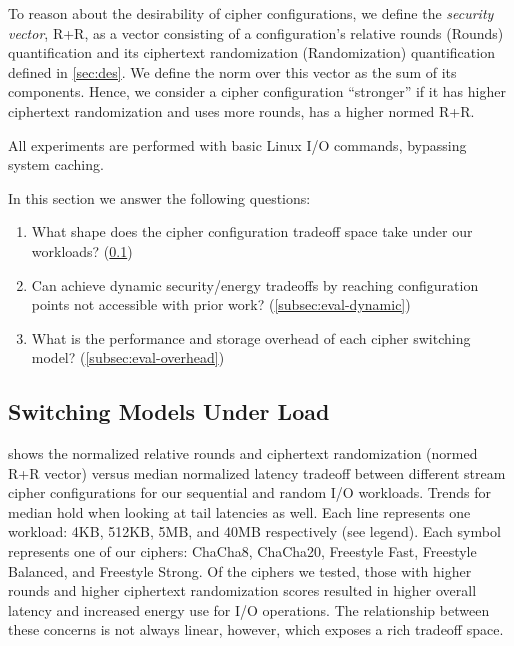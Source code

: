 To reason about the desirability of cipher configurations, we define the
{\em security vector}, R+R, as a vector consisting of a configuration's
relative rounds (Rounds) quantification and its ciphertext randomization
(Randomization) quantification defined in \cref{sec:des}. We define the norm
over this vector as the sum of its components. Hence, we consider a cipher
configuration ``stronger'' if it has higher ciphertext randomization and uses
more rounds, \ie has a higher normed R+R.

All experiments are performed with basic Linux I/O commands, bypassing system
caching.

In this section we answer the following questions:

\begin{enumerate}
  \item What shape does the cipher configuration tradeoff space take under our
  workloads? (\cref{subsec:eval-baseline})
  \item Can \sys achieve dynamic security/energy tradeoffs by reaching
  configuration points not accessible with prior work?
  (\cref{subsec:eval-dynamic})
  \item What is the performance and storage overhead of each cipher switching
  model? (\cref{subsec:eval-overhead})
\end{enumerate}


\subsection{Switching Models Under Load}\label{subsec:eval-baseline}



 shows the normalized relative rounds and
ciphertext randomization (normed R+R vector) versus median normalized latency
tradeoff between different stream cipher configurations for our sequential and
random I/O workloads. Trends for median hold when looking at tail latencies as
well. Each line represents one workload: 4KB, 512KB, 5MB, and 40MB respectively
(see legend). Each symbol represents one of our ciphers: ChaCha8, ChaCha20,
Freestyle Fast, Freestyle Balanced, and Freestyle Strong. Of the ciphers we
tested, those with higher rounds and higher ciphertext randomization
scores resulted in higher overall latency and increased energy use for I/O
operations. The relationship between these concerns is not always linear,
however, which exposes a rich tradeoff space.

